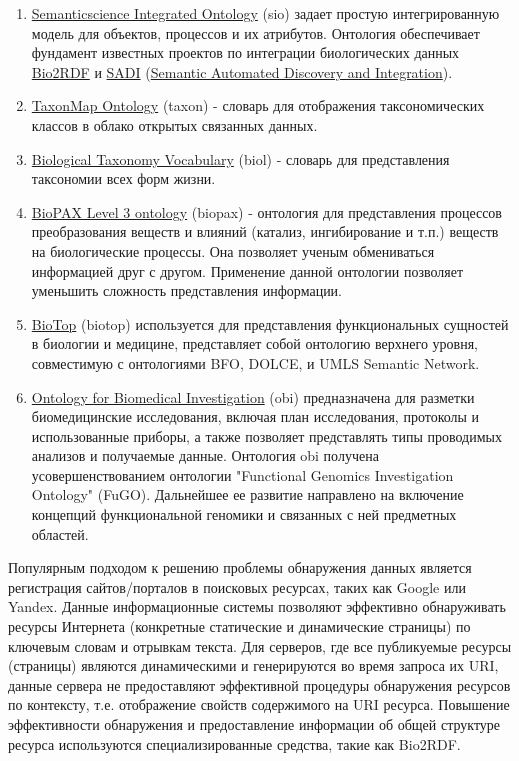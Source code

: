 \documentclass[a4paper,12pt,openany,final]{extreport}
\begin{document}
\begin{enumerate}
\def\labelenumi{\arabic{enumi}.}
\item
  \href{https://github.com/micheldumontier/semanticscience}{{Semanticscience
  Integrated Ontology}} (sio) задает простую интегрированную модель для
  объектов, процессов и их атрибутов. Онтология обеспечивает фундамент
  известных проектов по интеграции биологических данных
  \href{http://bio2rdf.org}{{Bio2RDF}} и
  \href{http://sadiframework.org}{{SADI}}
  (\href{http://sadiframework.org/content/about-sadi/}{{Semantic
  Automated Discovery and Integration}}).
\item
  \href{http://purl.org/biodiversity/taxon/}{{TaxonMap Ontology}}
  (taxon) - словарь для отображения таксономических классов в облако
  открытых связанных данных.
\item
  \href{http://purl.org/NET/biol/ns}{{Biological Taxonomy Vocabulary}}
  (biol) - словарь для представления таксономии всех форм жизни.
\item
  \href{http://www.biopax.org/}{{BioPAX Level 3 ontology}} (biopax) -
  онтология для представления процессов преобразования веществ и влияний
  (катализ, ингибирование и т.п.) веществ на биологические процессы. Она
  позволяет ученым обмениваться информацией друг с другом. Применение
  данной онтологии позволяет уменьшить сложность представления
  информации.
\item
  \href{http://biotopontology.github.io/}{{BioTop}} (biotop)
  используется для представления функциональных сущностей в биологии и
  медицине, представляет собой онтологию верхнего уровня, совместимую с
  онтологиями BFO, DOLCE, и UMLS Semantic Network.
\item
  \href{https://raw.githubusercontent.com/obi-ontology/obi/v2017-09-03/obi.owl}{{Ontology
  for Biomedical Investigation}} (obi) предназначена для разметки
  биомедицинские исследования, включая план исследования, протоколы и
  использованные приборы, а также позволяет представлять типы проводимых
  анализов и получаемые данные. Онтология obi получена
  усовершенствованием онтологии "Functional Genomics Investigation
  Ontology" (FuGO). Дальнейшее ее развитие направлено на включение
  концепций функциональной геномики и связанных с ней предметных
  областей.
\end{enumerate}

Популярным подходом к решению проблемы обнаружения данных является
регистрация сайтов/порталов в поисковых ресурсах, таких как Google или
Yandex. Данные информационные системы позволяют эффективно обнаруживать
ресурсы Интернета (конкретные статические и динамические страницы) по
ключевым словам и отрывкам текста. Для серверов, где все публикуемые
ресурсы (страницы) являются динамическими и генерируются во время
запроса их URI, данные сервера не предоставляют эффективной процедуры
обнаружения ресурсов по контексту, т.е. отображение свойств содержимого
на URI ресурса. Повышение эффективности обнаружения и предоставление
информации об общей структуре ресурса используются специализированные
средства, такие как Bio2RDF.
\end{document}
